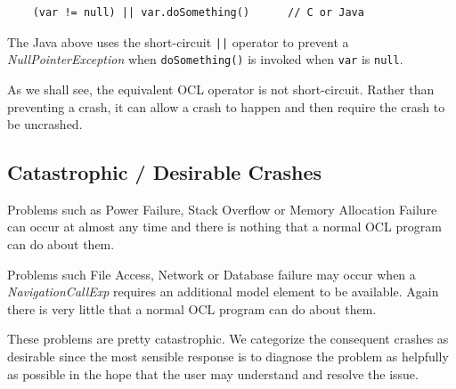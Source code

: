 \documentclass[
]{ceurart}
\begin{document}
\begin{verbatim}
    (var != null) || var.doSomething()		// C or Java
\end{verbatim}

The Java above uses the short-circuit \verb&||& operator to prevent a \emph{NullPointerException} when \verb|doSomething()| is invoked when \verb|var| is \verb|null|.

As we shall see, the equivalent OCL operator is not short-circuit. Rather than preventing a crash, it can allow a crash to happen and then require the crash to be uncrashed.

\subsection{Catastrophic / Desirable Crashes}

Problems such as Power Failure, Stack Overflow or Memory Allocation Failure can occur at almost any time and there is nothing that a normal OCL program can do about them.

Problems such File Access, Network or Database failure may occur when a \emph{NavigationCallExp} requires an additional model element to be available. Again there is very little that a normal OCL program can do about them.

These problems are pretty catastrophic. We categorize the consequent crashes as desirable since the most sensible response is to diagnose the problem as helpfully as possible in the hope that the user may understand and resolve the issue.







\end{document}
